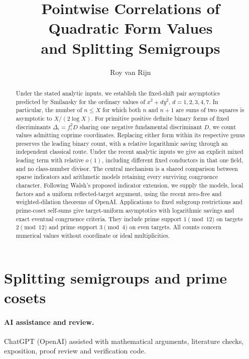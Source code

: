 \documentclass[11pt,a4paper]{article}
\title{Pointwise Correlations of Quadratic Form Values\\
and Splitting Semigroups}
\author{Roy van Rijn}
\date{}
\theoremstyle{definition}
\theoremstyle{remark}
\newcommand{\1}{\mathbf 1}
\begin{document}
\maketitle
\begin{abstract}
Under the stated analytic inputs, we establish the fixed-shift pair
asymptotics predicted by Smilansky for the ordinary values of
\(x^2+dy^2\), \(d=1,2,3,4,7\).
In particular, the number of \(n\le X\) for which both \(n\) and
\(n+1\) are sums of two squares is asymptotic to \(X/(2\log X)\).
For primitive positive definite binary forms of fixed discriminants
\(\Delta_i=f_i^2D\) sharing one negative fundamental discriminant \(D\),
we count values admitting coprime coordinates. Replacing either form
within its respective genus preserves the leading binary count, with
a relative logarithmic saving through an independent classical route.
Under the recent analytic inputs we give an explicit mixed leading term
with relative \(o(1)\), including different fixed conductors in that
one field, and no class-number divisor.
The central mechanism is a shared comparison between sparse indicators
and arithmetic models retaining every surviving congruence character.
Following Walsh's proposed indicator extension, we supply the models,
local factors and a uniform reflected-target argument, using the recent
zero-free and weighted-dilation theorems of OpenAI.
Applications to fixed subgroup restrictions and prime-coset self-sums
give target-uniform asymptotics with logarithmic savings and exact
eventual congruence criteria. They include prime support \(1\pmod{12}\)
on targets \(2\pmod{12}\) and prime support \(3\pmod4\) on even targets.
All counts concern numerical values without coordinate or ideal multiplicities.
\end{abstract}

\setcounter{tocdepth}{1}
\begingroup\small
\makeatletter
\renewcommand*\l@section{\@dottedtocline{1}{0em}{2em}}
\makeatother
\tableofcontents
\endgroup









\section{Splitting semigroups and prime cosets}\label{sec:semigroup-apps}






\appendix

\paragraph{AI assistance and review.}
ChatGPT (OpenAI) assisted with mathematical arguments, literature checks,
exposition, proof review and verification code.

\end{document}
